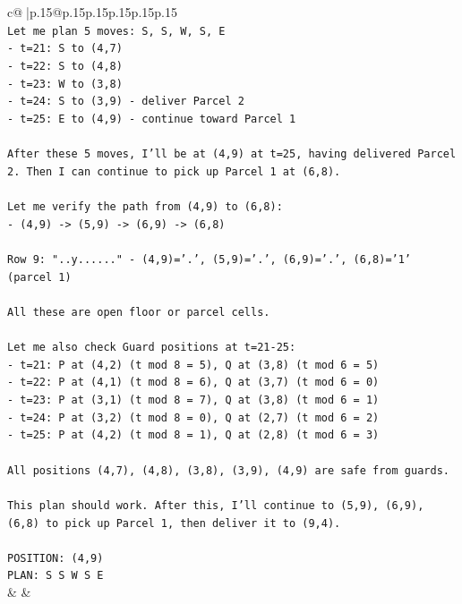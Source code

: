 \documentclass{article}
\begin{document}
{\begin{supertabular}{c@{$\;$}|p{.15\linewidth}@{}p{.15\linewidth}p{.15\linewidth}p{.15\linewidth}p{.15\linewidth}p{.15\linewidth}}
{{{\\ 
\texttt{Let me plan 5 moves: S, S, W, S, E} \\
\texttt{{-} t=21: S to (4,7)} \\
\texttt{{-} t=22: S to (4,8)} \\
\texttt{{-} t=23: W to (3,8)} \\
\texttt{{-} t=24: S to (3,9) {-} deliver Parcel 2} \\
\texttt{{-} t=25: E to (4,9) {-} continue toward Parcel 1} \\
\\ 
\texttt{After these 5 moves, I'll be at (4,9) at t=25, having delivered Parcel 2. Then I can continue to pick up Parcel 1 at (6,8).} \\
\\ 
\texttt{Let me verify the path from (4,9) to (6,8):} \\
\texttt{{-} (4,9) {-}> (5,9) {-}> (6,9) {-}> (6,8)} \\
\\ 
\texttt{Row 9: "..y......" {-} (4,9)='.', (5,9)='.', (6,9)='.', (6,8)='1' (parcel 1)} \\
\\ 
\texttt{All these are open floor or parcel cells.} \\
\\ 
\texttt{Let me also check Guard positions at t=21{-}25:} \\
\texttt{{-} t=21: P at (4,2) (t mod 8 = 5), Q at (3,8) (t mod 6 = 5)} \\
\texttt{{-} t=22: P at (4,1) (t mod 8 = 6), Q at (3,7) (t mod 6 = 0)} \\
\texttt{{-} t=23: P at (3,1) (t mod 8 = 7), Q at (3,8) (t mod 6 = 1)} \\
\texttt{{-} t=24: P at (3,2) (t mod 8 = 0), Q at (2,7) (t mod 6 = 2)} \\
\texttt{{-} t=25: P at (4,2) (t mod 8 = 1), Q at (2,8) (t mod 6 = 3)} \\
\\ 
\texttt{All positions (4,7), (4,8), (3,8), (3,9), (4,9) are safe from guards.} \\
\\ 
\texttt{This plan should work. After this, I'll continue to (5,9), (6,9), (6,8) to pick up Parcel 1, then deliver it to (9,4).} \\
\\ 
\texttt{POSITION: (4,9)} \\
\texttt{PLAN: S S W S E} \\
            }
        }
    }
    & & \\ \\


\end{supertabular}}
\end{document}
